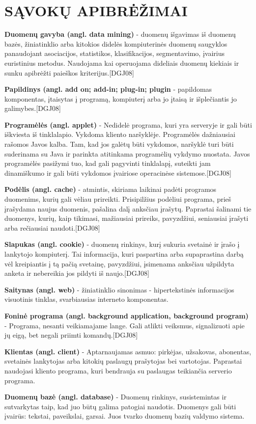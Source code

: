 \documentclass[12pt,a4paper,titlepage]{article}
\begin{document}
\section*{SĄVOKŲ APIBRĖŽIMAI}

\textbf{Duomenų gavyba (angl. data mining)} - duomenų išgavimas iš duomenų bazės, žiniatinklio arba kitokios didelės kompiuterinės duomenų saugyklos panaudojant asociacijos, statistikos, klasifikacijos, segmentavimo, įvairius euristinius metodus. Naudojama kai operuojama dideliais duomenų kiekiais ir sunku apibrėžti paieškos kriterijus.[DGJ08]

\textbf{Papildinys (angl. add on; add-in; plug-in; plugin} - papildomas komponentas, įtaisytas į programą, kompiuterį arba jo įtaisą ir išplečiantis jo galimybes.[DGJ08]

\textbf{Programėlės (angl. applet)} - Nedidelė programa, kuri yra serveryje ir gali būti iškviesta iš tinklalapio. Vykdoma kliento naršyklėje.
Programėlės dažniausiai rašomos Javos kalba. Tam, kad jos galėtų būti vykdomos, naršyklė turi būti suderinama su Java ir parinkta atitinkama programėlių vykdymo nuostata. Javos programėlės pasižymi tuo, kad gali pagyvinti tinklalapį, suteikti jam dinamiškumo ir gali būti vykdomos įvairiose operacinėse sistemose.[DGJ08]

\textbf{Podėlis (angl. cache)} - atmintis, skiriama laikinai padėti programos duomenims, kurių gali vėliau prireikti. Prisipilžius podėliui programa, prieš įrašydama naujus duomenis, pašalina dalį anksčiau įrašytų. Paprastai šalinami tie duomenys, kurių, kaip tikimasi, mažiausiai prireiks, pavyzdžiui, seniausiai įrašyti arba rečiausiai naudoti.[DGJ08]

\textbf{Slapukas (angl. cookie)} - duomenų rinkinys, kurį sukuria svetainė ir įrašo į lankytojo kompiuterį. Tai informacija, kuri paspartina arba supaprastina darbą vėl kreipiantis į tą pačią svetainę, pavyzdžiui, įsimenama anksčiau užpildyta anketa ir nebereikia jos pildyti iš naujo.[DGJ08]

\textbf{Saitynas (angl. web)} - žiniatinklio sinonimas - hipertekstinės informacijos visuotinis tinklas, svarbiausias interneto komponentas.

\textbf{Foninė programa (angl. background application, background program)} - Programa, nesanti veikiamajame lange.
Gali atlikti veiksmus, signalizuoti apie jų eigą, bet negali priimti komandų.[DGJ08]

\textbf{Klientas (angl. client)} - Aptarnaujamas asmuo: pirkėjas, užsakovas, abonentas, svetainės lankytojas arba kitokių paslaugų prašytojas bei vartotojas. Paprastai naudojasi kliento programa, kuri bendrauja su paslaugas teikiančia serverio programa.

\textbf{Duomenų bazė (angl. database)} - Duomenų rinkinys, susistemintas ir sutvarkytas taip, kad juo būtų galima patogiai naudotis. Duomenys gali būti įvairūs: tekstai, paveikslai, garsai. Juos tvarko duomenų bazių valdymo sistema.
\end{document}
